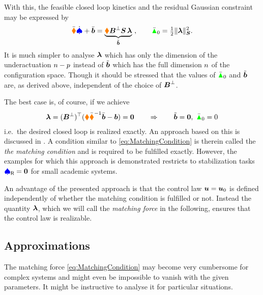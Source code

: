 With this, the feasible closed loop kinetics and the residual Gaussian constraint may be expressed by
\begin{align}
 \sysInertiaMatC\sysVeld + \sysForceC = \underbrace{\sysInertiaMat \sysInputMatLComp \mat{S} \, \tuple{\lambda}}_{\tilde{\sysForce}} \ ,
\qquad
 \GaussianConstraintC_0 = \tfrac{1}{2} \norm[\mat{S}]{\tuple{\lambda}}^2.
\end{align}
It is much simpler to analyse $\tuple{\lambda}$ which has only the dimension of the underactuation $\dimConfigSpace-\numInputs$ instead of $\tilde{\tuple{b}}$ which has the full dimension $\dimConfigSpace$ of the configuration space.
Though it should be stressed that the values of $\GaussianConstraintC_0$ and $\tilde{\tuple{b}}$ are, as derived above, independent of the choice of $\sysInputMatLComp$.

The best case is, of course, if we achieve 
\begin{align}\label{eq:MatchingCondition}
 \tuple{\lambda} = (\sysInputMatLComp)^\top (\sysInertiaMat \sysInertiaMatC^{-1} \sysForceC - \sysForce) = \tuple{0}
\qquad \Rightarrow \qquad
 \tilde{\tuple{b}} = \tuple{0}, \ \GaussianConstraintC_0 = 0
\end{align}
i.e.\ the desired closed loop is realized exactly.
An approach based on this is discussed in \cite{bloch2000controlled}.
A condition similar to \eqref{eq:MatchingCondition} is therein called the \textit{the matching condition} and is required to be fulfilled exactly.
However, the examples for which this approach is demonstrated restricts to stabilization tasks $\sysVelR = \tuple{0}$ for small academic systems.

An advantage of the presented approach is that the control law $\sysInput = \sysInput_0$ is defined independently of whether the matching condition is fulfilled or not.
Instead the quantity $\tuple{\lambda}$, which we will call the \textit{matching force} in the following, ensures that the control law is realizable.

\subsection{Approximations}
The matching force \eqref{eq:MatchingCondition} may become very cumbersome for complex systems and might even be impossible to vanish with the given parameters.
It might be instructive to analyse it for particular situations.

